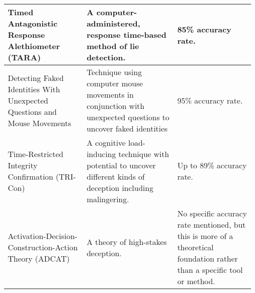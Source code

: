{\begin{longtable}{L{1.5in} L{2.5in} L{2in}}
Timed Antagonistic Response Alethiometer (TARA)\cite{gregg2007vying} & A computer-administered, response time-based method of lie detection. & 85\% accuracy rate. \\ \midrule
Detecting Faked Identities With Unexpected Questions and Mouse Movements & Technique using computer mouse movements in conjunction with unexpected questions to uncover faked identities\cite{monaro2017detection} & 95\% accuracy rate. \\ \midrule
Time-Restricted Integrity Confirmation (TRI-Con) & A cognitive load-inducing technique with potential to uncover different kinds of deception including malingering. & Up to 89\% accuracy rate. \\ \midrule 
Activation-Decision-Construction-Action Theory (ADCAT) & A theory of high-stakes deception. & No specific accuracy rate mentioned, but this is more of a theoretical foundation rather than a specific tool or method. \\ \bottomrule
\end{longtable}}
